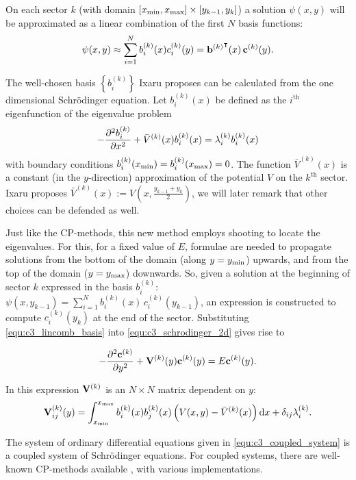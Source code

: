 On each sector $k$ (with domain $[{x_{\text{min}}}, {x_{\text{max}}}]\times[y_{k-1}, y_k]$) a solution $\psi(x, y)$ will be approximated as a linear combination of the first $N$ basis functions:
\begin{equation}\label{equ:c3_lincomb_basis}
    \psi(x, y) \approx \sum_{i=1}^{N} b_i^{(k)}(x) c_i^{(k)}(y) = {\vb{b}^{(k)}}^\intercal(x) \, \vb{c}^{(k)}(y) \text{.}
\end{equation}

The well-chosen basis $\left\{b_i^{(k)}\right\}$ Ixaru proposes can be calculated from the one dimensional Schrödinger equation. Let $b_i^{(k)}(x)$ be defined as the $i^\text{th}$ eigenfunction of the eigenvalue problem
$$
    -\pdv[2]{b_i^{(k)}}{x} + \bar{V}^{(k)}(x)b_i^{(k)}(x) = \lambda_i^{(k)} b_i^{(k)}(x)
$$
with boundary conditions $b_i^{(k)}({x_{\text{min}}}) = b_i^{(k)}({x_{\text{max}}}) = 0$. The function $\bar{V}^{(k)}(x)$ is a constant (in the $y$-direction) approximation of the potential $V$ on the $k^\text{th}$ sector. Ixaru proposes $\bar{V}^{(k)}(x) := V\left(x, \frac{y_{k-1} + y_k}{2}\right)$, we will later remark that other choices can be defended as well.

Just like the CP-methods, this new method employs shooting to locate the eigenvalues. For this, for a fixed value of $E$, formulae are needed to propagate solutions from the bottom of the domain (along $y = {y_{\text{min}}}$) upwards, and from the top of the domain ($y = {y_{\text{max}}}$) downwards. So, given a solution at the beginning of sector $k$ expressed in the basis $b_i^{(k)}$:
$ \psi(x, y_{k-1}) = \sum_{i=1}^{N} b_i^{(k)}(x)\, c_i^{(k)}(y_{k-1}) $, an expression is constructed to compute $c^{(k)}_i(y_k)$ at the end of the sector. Substituting \eqref{equ:c3_lincomb_basis} into \eqref{equ:c3_schrodinger_2d} gives rise to

\begin{equation}\label{equ:c3_coupled_system}
    -\pdv[2]{\vb{c}^{(k)}}{y} + \vb{V}^{(k)}(y) \vb{c}^{(k)}(y) = E \vb{c}^{(k)}(y) \text{.}
\end{equation}

In this expression $\vb{V}^{(k)}$ is an $N\times N$ matrix dependent on $y$:
\begin{equation}\label{equ:c3_v_matrix}
    \vb{V}^{(k)}_{ij}(y) = \int_{{x_{\text{min}}}}^{{x_{\text{max}}}} b_i^{(k)}(x) b_j^{(k)}(x) \left(V(x, y) - \bar{V}^{(k)}(x)\right) \dd x + \delta_{ij} \lambda_i^{(k)} \text{.}
\end{equation}

The system of ordinary differential equations given in \eqref{equ:c3_coupled_system} is a coupled system of Schrö\-dinger equations. For coupled systems, there are well-known CP-methods available \cite{ledoux_numerical_2007a,ixaru_lilix_2002}, with various implementations.


